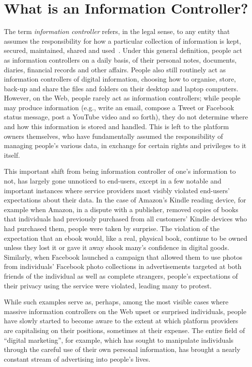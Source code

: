 \documentclass{amsart}
\begin{document}
\section{What is an Information Controller?}

The term \emph{information controller} refers, in the legal sense, to any entity that assumes the responsibility for how a particular collection of information is kept, secured, maintained, shared and used~\cite{}.  Under this general definition, people act as information controllers on a daily basis, of their personal notes, documents, diaries, financial records and other affairs.  People also still routinely act as information controllers of digital information, choosing how to organise, store, back-up and share the files and folders on their desktop and laptop computers. However, on the Web, people rarely act as information controllers; while people may produce information (e.g., write an email, compose a Tweet or Facebook status message, post a YouTube video and so forth), they do not determine where and how this information is stored and handled.  This is left to the platform owners themselves, who have fundamentally assumed the responsibility of managing people's various data, in exchange for certain rights and privileges to it itself.

This important shift from being information controller of one's information to not, has largely gone unnoticed to end-users, except in a few notable and important instances where service providers most visibly violated end-users' expectations about their data.  In the case of Amazon's Kindle reading device, for example when Amazon, in a dispute with a publisher, removed copies of books that individuals had previously purchased from all customers' Kindle devices who had purchased them, people were taken by surprise.  The violation of the expectation that an ebook would, like a real, physical book, continue to be owned unless they lost it or gave it away shook many's confidence in digital goods.   Similarly, when Facebook launched a campaign that allowed them to use photos from individuals' Facebook photo collections in advertisements targeted at both friends of the individual as well as complete strangers, people's expectations of their privacy using the service were violated, leading many to protest.

While such examples serve as, perhaps, among the most visible cases where massive information controllers on the Web upset or surprised individuals,  people have slowly started to become aware to the extent at which platform providers are capitalising on their positions, sometimes at their expense.  The entire field of ``digital marketing'', for example, which has sought to manipulate individuals through the careful use of their own personal information, has brought a nearly constant stream of advertising into people's lives.  
\end{document}
